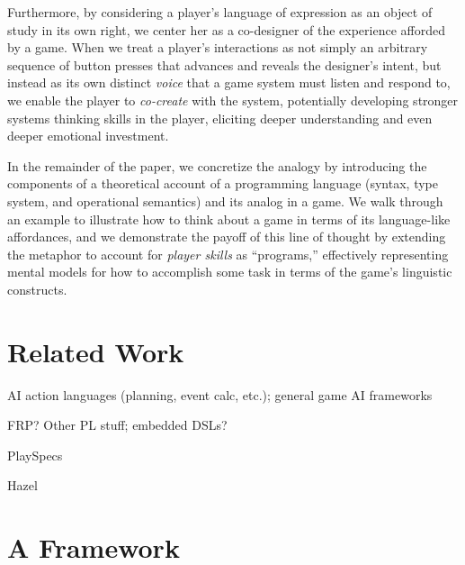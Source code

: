 \documentclass[sigconf]{acmart}
\begin{document}

%
%


Furthermore, by considering a player's language of expression as an object
of study in its own right, we center her as a co-designer of the experience
afforded by a game. When we treat a player's interactions as not simply an
arbitrary sequence of button presses that advances and reveals the
designer's intent, but instead as its own distinct {\em voice} that a game
system must listen and respond to, we enable the player to {\em co-create}
with the system, potentially developing stronger systems thinking skills in
the player, eliciting deeper understanding and even deeper emotional
investment.

In the remainder of the paper, we concretize the analogy by introducing the
components of a theoretical account of a programming language (syntax, type
system, and operational semantics) and its analog in a game. We walk
through an example to illustrate how to think about a game in terms of its
language-like affordances, and we demonstrate the payoff of this line of
thought by extending the metaphor to account for {\em player skills} as
``programs,'' effectively representing mental models for how to accomplish
some task in terms of the game's linguistic constructs.


\section{Related Work}

AI action languages (planning, event calc, etc.); general game AI frameworks

FRP? Other PL stuff; embedded DSLs?

PlaySpecs

Hazel

\section{A Framework}
\end{document}
